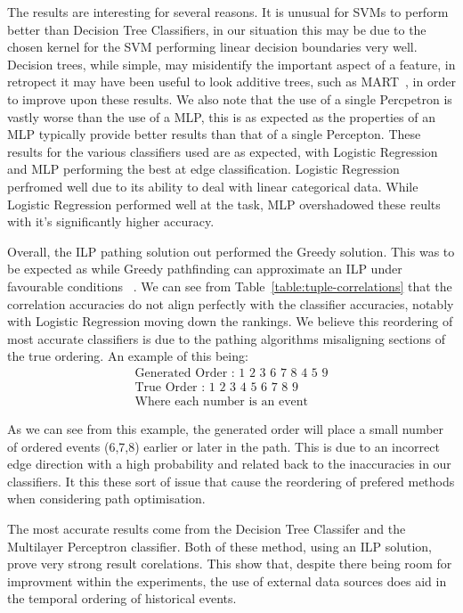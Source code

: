 \documentclass[bsc,frontabs,twoside,singlespacing,parskip,deptreport]{infthesis}     %
\begin{document}
The results are interesting for several reasons.
It is unusual for SVMs to perform better than Decision Tree Classifiers, in our situation this may be due to the chosen
kernel for the SVM performing linear decision boundaries very well. Decision trees, while simple, may misidentify the important
aspect of a  feature, in retropect it may have been useful to look additive trees, such as MART~\cite{}, in order to
improve upon these results.
We also note that the use of a single Percpetron is vastly worse than the use of a MLP, this is as expected as
the properties of an MLP typically provide better results than that of a single Percepton.
These results for the various classifiers used are as expected, with Logistic Regression and MLP performing the best
at edge classification. Logistic Regression perfromed well due to its ability to deal with linear categorical data.
While Logistic Regression performed well at the task, MLP overshadowed these reults with it's significantly higher
accuracy. 


Overall, the ILP pathing solution out performed the Greedy solution. This was to be expected as while Greedy pathfinding can
approximate an ILP under favourable conditions ~\cite{}. We can see from Table~\ref{table:tuple-correlations} that the
correlation accuracies do not align perfectly with the classifier accuracies, notably with Logistic Regression moving
down the rankings. We believe this reordering of most accurate classifiers is due to the pathing algorithms misaligning
sections of the true ordering. An example of this being:
\begin{align}\nonumber
  \text{Generated Order : 1 2 3 6 7 8 4 5 9}\\\nonumber
  \text{True Order : 1 2 3 4 5 6 7 8 9}\\\nonumber
  \text{Where each number is an event}\nonumber
\end{align}

As we can see from this example, the generated order will place a small number of ordered events (6,7,8) earlier or
later in the path. This is due to an incorrect edge direction with a high probability and related back to the
inaccuracies in our classifiers. It this these sort of issue that cause the reordering of prefered methods when considering
path optimisation.

The most accurate results come from the Decision Tree Classifer and the Multilayer Perceptron classifier.
Both of these method, using an ILP solution, prove very strong result corelations. This show that, despite there
being room for improvment within the experiments, the use of external data sources does aid in the temporal ordering
of historical events.
\end{document}
